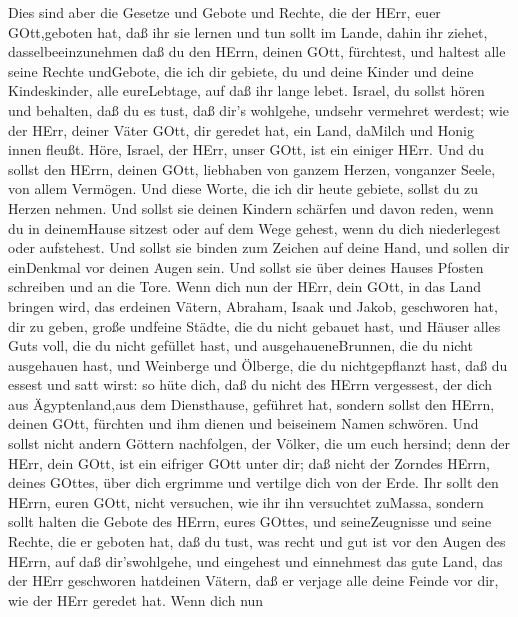  Dies sind aber die Gesetze und Gebote und Rechte, die der
HErr, euer GOtt,geboten hat, daß ihr sie lernen und tun sollt im Lande,
dahin ihr ziehet, dasselbeeinzunehmen  daß du den HErrn,
deinen GOtt, fürchtest, und haltest alle seine Rechte undGebote, die ich
dir gebiete, du und deine Kinder und deine Kindeskinder, alle
eureLebtage, auf daß ihr lange lebet.  Israel, du sollst
hören und behalten, daß du es tust, daß dir's wohlgehe, undsehr
vermehret werdest; wie der HErr, deiner Väter GOtt, dir geredet hat, ein
Land, daMilch und Honig innen fleußt.  Höre, Israel, der
HErr, unser GOtt, ist ein einiger HErr.  Und du sollst den
HErrn, deinen GOtt, liebhaben von ganzem Herzen, vonganzer Seele, von
allem Vermögen.  Und diese Worte, die ich dir heute gebiete,
sollst du zu Herzen nehmen.  Und sollst sie deinen Kindern
schärfen und davon reden, wenn du in deinemHause sitzest oder auf dem
Wege gehest, wenn du dich niederlegest oder aufstehest.  Und
sollst sie binden zum Zeichen auf deine Hand, und sollen dir einDenkmal
vor deinen Augen sein.  Und sollst sie über deines Hauses
Pfosten schreiben und an die Tore.  Wenn dich nun der HErr,
dein GOtt, in das Land bringen wird, das erdeinen Vätern, Abraham, Isaak
und Jakob, geschworen hat, dir zu geben, große undfeine Städte, die du
nicht gebauet hast,  und Häuser alles Guts voll, die du
nicht gefüllet hast, und ausgehaueneBrunnen, die du nicht ausgehauen
hast, und Weinberge und Ölberge, die du nichtgepflanzt hast, daß du
essest und satt wirst:  so hüte dich, daß du nicht des
HErrn vergessest, der dich aus Ägyptenland,aus dem Diensthause, geführet
hat,  sondern sollst den HErrn, deinen GOtt, fürchten und
ihm dienen und beiseinem Namen schwören.  Und sollst nicht
andern Göttern nachfolgen, der Völker, die um euch hersind;
 denn der HErr, dein GOtt, ist ein eifriger GOtt unter dir;
daß nicht der Zorndes HErrn, deines GOttes, über dich ergrimme und
vertilge dich von der Erde.  Ihr sollt den HErrn, euren
GOtt, nicht versuchen, wie ihr ihn versuchtet zuMassa, 
sondern sollt halten die Gebote des HErrn, eures GOttes, und
seineZeugnisse und seine Rechte, die er geboten hat,  daß
du tust, was recht und gut ist vor den Augen des HErrn, auf daß
dir'swohlgehe, und eingehest und einnehmest das gute Land, das der HErr
geschworen hatdeinen Vätern,  daß er verjage alle deine
Feinde vor dir, wie der HErr geredet hat.  Wenn dich nun
